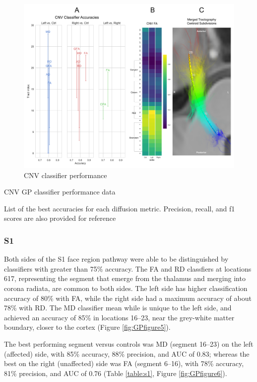 \begin{figure}[h]
\centering
\includegraphics[width=\linewidth]{figure-GP-CNV.pdf}
\caption{CNV classifier performance}
\label{fig:GPfigure4}
\end{figure}

\begin{table}[h]
\centering
{}
\caption{CNV GP classifier performance data}
\caption*{List of the best accuracies for each diffusion metric. Precision, recall, and f1 scores are also provided for reference}
\label{table:cnv}
\end{table}

\subsubsection{S1}
Both sides of the S1 face region pathway were able to be distinguished by classifiers with greater than 75\% accuracy. 
The FA and RD classfiers at locations 617, representing the segment that emerge from the thalamus and merging into corona radiata, are common to both sides. The left side has higher classification accuracy of 80\% with FA, while the right side had a maximum accuracy of about 78\% with RD. 
The MD classifier mean while is unique to the left side, and achieved an accuracy of 85\% in locations 16--23, near the grey-white matter boundary, closer to the cortex (Figure \ref{fig:GPfigure5}).

The best performing segment versus controls was MD (segment 16--23) on the left (affected) side, with 85\% accuracy, 88\% precision, and AUC of 0.83; whereas the best on the right (unaffected) side was FA (segment 6--16), with 78\% accuracy, 81\% precision, and AUC of 0.76 (Table \ref{table:s1}, Figure \ref{fig:GPfigure6}). 

